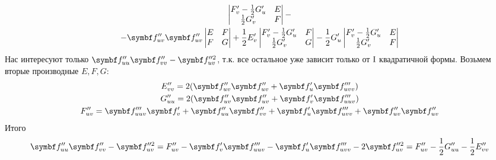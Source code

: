 \documentclass[main]{subfiles}
\begin{document}
\begin{longProof}
\begin{multline*}
\begin{vmatrix}
            F'_v - \frac{1}{2} G'_u & E \\
            \frac{1}{2}G'_v         & F
        \end{vmatrix}-\\
        - \vf''_{uv} \vf''_{uv} \begin{vmatrix}
            E & F \\
            F & G
        \end{vmatrix}
        + \frac{1}{2} E'_v \begin{vmatrix}
            F'_v - \frac{1}{2}G'_u & F \\
            \frac{1}{2}G'_v        & G
        \end{vmatrix}
        - \frac{1}{2} G'_u \begin{vmatrix}
            F'_v - \frac{1}{2}G'_u & E \\
            \frac{1}{2}G'_v        & F
        \end{vmatrix}
    \end{multline*}
    Нас интересуют только $\vf''_{uu}\vf''_{vv} - \vf''^2_{uv}$, т.к. все остальное уже зависит только от $\mathrm{I}$ квадратичной формы.
    Возьмем вторые производные $E,F,G$:
    \begin{gather*}
        E''_{vv} = 2 (\vf''_{uv} \vf''_{uv} + \vf'_u \vf'''_{uvv})\\
        G''_{uu} = 2 (\vf''_{uv} \vf''_{uv} + \vf'_v \vf'''_{uuv})\\
        F''_{uv} = \vf'''_{uuv} \vf'_v + \vf''_{uu} \vf''_{vv} + \vf'_u \vf'''_{uvv} + \vf''_{uv} \vf''_{uv}\\
    \end{gather*}
    Итого
    \[\vf''_{uu}\vf''_{vv} - \vf''^2_{uv} = F''_{uv}- \vf'_v\vf'''_{uuv} - \vf'_u \vf'''_{uvv} - 2 \vf''^2_{uv} = F''_{uv} - \frac{1}{2}G''_{uu} - \frac{1}{2} E''_{vv}\]
\end{longProof}
\end{document}
